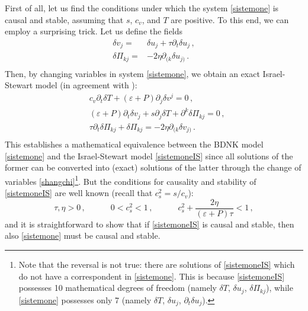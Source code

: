 \documentclass[a4paper, amsfonts, amssymb, amsmath, reprint, showkeys, nofootinbib, twoside,notitlepage,onecolumn,preprintnumbers]{revtex4-2}
\newcommand{\spc}{\quad \quad \quad}
\theoremstyle{definition}
\theoremstyle{theorem}
\theoremstyle{corollary}
\begin{document}
First of all, let us find the conditions under which the system \eqref{sistemone} is causal and stable, assuming that $s$, $c_v$, and $T$ are positive. To this end, we can employ a surprising trick. Let us define the fields
\begin{equation}\label{shangchi}
\begin{split}
\delta v_j ={}& \delta u_j +\tau \partial_t \delta u_j \, , \\
\delta \Pi_{kj}={}& -2\eta \partial_{(k}\delta u_{j)} \, .\\
\end{split}
\end{equation}
Then, by changing variables in system \eqref{sistemone}, we obtain an exact Israel-Stewart model (in agreement with \cite{DoreGavassino2022}):
\begin{equation}\label{sistemoneIS}
\begin{split}
& c_v \partial_t \delta T +(\varepsilon{+}P)\partial_j \delta v^j =0 \, ,\\
& (\varepsilon{+}P)\partial_t \delta v_j+s\partial_j \delta T + \partial^k \delta \Pi_{kj} =0\, , \\
& \tau \partial_t \delta \Pi_{kj}+\delta \Pi_{kj}=-2\eta \partial_{(k} \delta v_{j)} \, . \\
\end{split}
\end{equation}
This establishes a mathematical equivalence between the BDNK model \eqref{sistemone} and the Israel-Stewart model \eqref{sistemoneIS} since all solutions of the former can be converted into (exact) solutions of the latter through the change of variables \eqref{shangchi}\footnote{Note that the reversal is not true: there are solutions of \eqref{sistemoneIS} which do not have a correspondent in \eqref{sistemone}. This is because \eqref{sistemoneIS} possesses 10 mathematical degrees of freedom (namely $\delta T$, $\delta u_j$, $\delta \Pi_{kj}$), while \eqref{sistemone} possesses only 7 (namely $\delta T$, $\delta u_j$, $\partial_t\delta u_j$).}. But the conditions for causality and stability of \eqref{sistemoneIS} are well known (recall that $c_s^2=s/c_v$):
\begin{equation}\label{condazze}
\tau,\eta >0 \, , \spc 0 <c_s^2<1 \, , \spc c_s^2+\dfrac{2\eta}{(\varepsilon {+} P)\tau} <1 \, ,
\end{equation}
and it is straightforward to show that if \eqref{sistemoneIS} is causal and stable, then also \eqref{sistemone} must be causal and stable.
\end{document}
